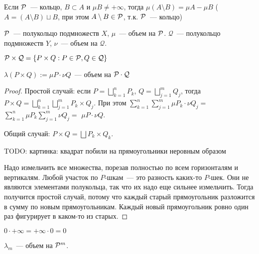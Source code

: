    \begin{observation}
   Если $\P$~--- кольцо, $B \subset A$ и $\mu B \neq + \infty$, тогда
   $\mu (A \setminus B) = \mu A - \mu B$ 
   ($A = (A \setminus B) \sqcup B$, при этом $A \setminus B \in \P$, 
   т.к. $\P$~--- кольцо)
   \end{observation}
   
   
   \begin{theorem}
    $\P$~--- полукольцо подмножеств $X$, $\mu$~--- объем на $\P$.
    $\mathcal{Q}$~--- полукольцо подмножеств $Y$, $\nu$~--- объем на $\mathcal{Q}$.
   
    $\P \times \mathcal{Q} = \{P \times Q : P \in \P, Q \in \mathcal{Q}\} $
   
    $\lambda (P \times Q) := \mu P \cdot \nu Q$~--- объем на $\P \cdot \mathcal{Q}$
   \end{theorem}
   
   \begin{proof}
    Простой случай: если $P = \bigsqcup \limits_{k = 1}^{n} P_k$, 
   $Q = \bigsqcup \limits_{j = 1}^{m} Q_j$, тогда 
   $P \times Q = \bigsqcup \limits_{k = 1}^{n} \bigsqcup \limits_{j = 1}^{m} P_k \times Q_j$.  При этом 
   $\sum \limits_{k=1}^{n}  \sum \limits_{j=1}^{m} \mu P_k \cdot \nu Q_j = $
   $\sum \limits_{k=1}^{n} \mu P_k \sum \limits_{j=1}^{m} \nu Q_j = $
   $\mu P \cdot \nu Q$. 
   
   Общий случай: $P \times Q = \bigsqcup P_k \times Q_k$.
   
   TODO: картинка: квадрат побили на прямоугольники неровным образом
   
   Надо измельчить все множества, порезав полностью по всем горизонталям и 
   вертикалям. Любой участок по $P$-шкам~--- это разность каких-то $P$-шек.
   Они не являются элементами полукольца, 
   так что их надо еще сильнее измельчить.
   Тогда получится простой случай, 
   потому что каждый старый прямоугольник разложится в сумму по новым 
   прямоугольникам. Каждый новый прямоугольник ровно один раз 
   фигурирует в каком-то из старых.
   \end{proof}
   
   \begin{observation}
       
   $0 \cdot +\infty = +\infty \cdot 0 = 0$
   \end{observation}
   
   \begin{consequence}
   $\lambda _m$~--- объем на $\P^m$.
   \end{consequence}
   
